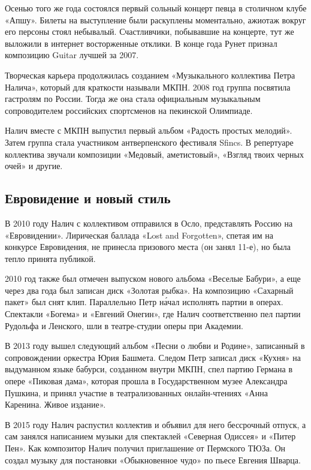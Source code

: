 Осенью того же года состоялся первый сольный концерт певца в столичном клубе «Апшу». Билеты на выступление были раскуплены моментально, ажиотаж вокруг его персоны стоял небывалый. Счастливчики, побывавшие на концерте, тут же выложили в интернет восторженные отклики. В конце года Рунет признал композицию Guitar лучшей за 2007.

Творческая карьера продолжилась созданием «Музыкального коллектива Петра Налича», который для краткости называли МКПН. 2008 год группа посвятила гастролям по России. Тогда же она стала официальным музыкальным сопроводителем российских спортсменов на пекинской Олимпиаде.

Налич вместе с МКПН выпустил первый альбом «Радость простых мелодий». Затем группа стала участником антверпенского фестиваля Sfincs. В репертуаре коллектива звучали композиции «Медовый, аметистовый», «Взгляд твоих черных очей» и другие.

\subsection{Евровидение и новый стиль}
В 2010 году Налич с коллективом отправился в Осло, представлять Россию на «Евровидении». Лирическая баллада «Lost and Forgotten», спетая им на конкурсе Евровидения, не принесла призового места (он занял 11-е), но была тепло принята публикой.

2010 год также был отмечен выпуском нового альбома «Веселые Бабури», а еще через два года был записан диск «Золотая рыбка». На композицию «Сахарный пакет» был снят клип. Параллельно Петр н\'{а}чал исполнять партии в операх. Спектакли «Богема» и «Евгений Онегин», где Налич соответственно пел партии Рудольфа и Ленского, шли в театре-студии оперы при Академии.

В 2013 году вышел следующий альбом «Песни о любви и Родине», записанный в сопровождении оркестра Юрия Башмета. Следом Петр записал диск «Кухня» на выдуманном языке бабурси, созданном внутри МКПН, спел партию Германа в опере «Пиковая дама», которая прошла в Государственном музее Александра Пушкина, и принял участие в театрализованных онлайн-чтениях «Анна Каренина. Живое издание».

В 2015 году Налич распустил коллектив и объявил для него бессрочный отпуск, а сам занялся написанием музыки для спектаклей «Северная Одиссея» и «Питер Пен». Как композитор Налич получил приглашение от Пермского ТЮЗа. Он создал музыку для постановки «Обыкновенное чудо» по пьесе Евгения Шварца.

